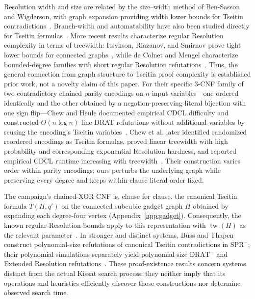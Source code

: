 \documentclass[11pt]{article}
\begin{document}
Resolution width and size are related by the size--width method of Ben-Sasson and Wigderson, with graph expansion providing width lower bounds for Tseitin contradictions~\cite{BenSassonWigderson2001}. Branch-width and automatability have also been studied directly for Tseitin formulas~\cite{AlekhnovichRazborov2011}. More recent results characterize regular Resolution complexity in terms of treewidth: Itsykson, Riazanov, and Smirnov prove tight lower bounds for connected graphs~\cite{ItsyksonEtAl2022}, while de Colnet and Mengel characterize bounded-degree families with short regular Resolution refutations~\cite{deColnetMengel2023}. Thus, the general connection from graph structure to Tseitin proof complexity is established prior work, not a novelty claim of this paper. For their specific 3-CNF family of two contradictory chained parity encodings on $n$ input variables---one ordered identically and the other obtained by a negation-preserving literal bijection with one sign flip---Chew and Heule documented empirical CDCL difficulty and constructed $O(n\log n)$-line DRAT refutations without additional variables by reusing the encoding's Tseitin variables~\cite{ChewHeule2020}. Chew et al. later identified randomized reordered encodings as Tseitin formulas, proved linear treewidth with high probability and corresponding exponential Resolution hardness, and reported empirical CDCL runtime increasing with treewidth~\cite{ChewEtAl2024}. Their construction varies order within parity encodings; ours perturbs the underlying graph while preserving every degree and keeps within-clause literal order fixed.

The campaign's chained-XOR CNF is, clause for clause, the canonical Tseitin formula $T(H,q')$ on the connected subcubic gadget graph $H$ obtained by expanding each degree-four vertex (Appendix~\ref{app:gadget}). Consequently, the known regular-Resolution bounds apply to this representation with $\operatorname{tw}(H)$ as the relevant parameter~\cite{ItsyksonEtAl2022,deColnetMengel2023}. In stronger and distinct systems, Buss and Thapen construct polynomial-size refutations of canonical Tseitin contradictions in $\mathrm{SPR}^{-}$; their polynomial simulations separately yield polynomial-size $\mathrm{DRAT}^{-}$ and Extended Resolution refutations~\cite{BussThapen2021}. These proof-existence results concern systems distinct from the actual Kissat search process: they neither imply that its operations and heuristics efficiently discover those constructions nor determine observed search time.
\end{document}
